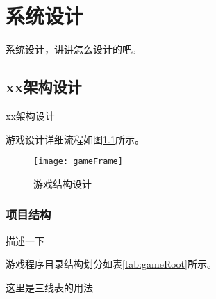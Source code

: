 \chapter{系统设计}
\label{chap:systemDesign} 

系统设计，讲讲怎么设计的吧。

\section{xx架构设计}

xx架构设计

游戏设计详细流程如图\ref{fig:gameFrame}所示。

\begin{figure}[H]
  \centering
  \texttt{[image: gameFrame]}
  \caption{游戏结构设计}
  \label{fig:gameFrame}
\end{figure}

\subsection{项目结构}
\label{sec:folderStructure}

描述一下

游戏程序目录结构划分如表\ref{tab:gameRoot}所示。

这里是三线表的用法


